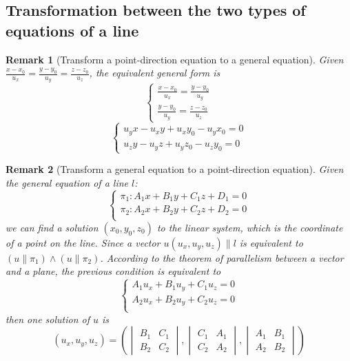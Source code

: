 \documentclass[onecolumn]{ctexart}
\newtheorem{remark}{Remark}
\begin{document}
\subsection{Transformation between the two types of equations of a line}

\begin{remark}[Transform a point-direction equation to a general equation]
  Given $\frac{x - x_0}{u_x} = \frac{y - y_0}{u_y} = \frac{z - z_0}{u_z}$, 
  the equivalent general form is
  \[
  \begin{cases}
    \frac{x - x_0}{u_x} = \frac{y - y_0}{u_y} \\
    \frac{y - y_0}{u_y} = \frac{z - z_0}{u_z}
  \end{cases}
  \]
  \begin{equation}
    \begin{cases}
      u_y x - u_x y + u_x y_0 - u_y x_0 = 0 \\
      u_z y - u_y z + u_y z_0 - u_z y_0 = 0
    \end{cases} 
  \end{equation}
\end{remark}

\begin{remark}[Transform a general equation to a point-direction equation]
  Given the general equation of a line $l$: 
  \[
  \begin{cases}
    \pi_1: A_1 x + B_1 y + C_1 z + D_1 = 0 \\
    \pi_2: A_2 x + B_2 y + C_2 z + D_2 = 0 \\
  \end{cases}
  \]
  we can find a solution $(x_0, y_0, z_0)$ to the linear system, which is the 
  coordinate of a point on the line. Since a vector $u(u_x, u_y, u_z) \parallel l$ 
  is equivalent to $(u \parallel \pi_1) \wedge (u \parallel \pi_2)$. According to 
  the theorem of parallelism between a vector and a plane, the previous condition 
  is equivalent to 
  \[
  \begin{cases}
    A_1 u_x + B_1 u_y + C_1 u_z = 0 \\
    A_2 u_x + B_2 u_y + C_2 u_z = 0 \\
  \end{cases}
  \]
  then one solution of $u$ is
  \[
  (u_x, u_y, u_z) = 
  \left(
  \begin{vmatrix}
    B_1 & C_1 \\
    B_2 & C_2
  \end{vmatrix},
  \begin{vmatrix}
    C_1 & A_1 \\
    C_2 & A_2
  \end{vmatrix},
  \begin{vmatrix}
    A_1 & B_1 \\
    A_2 & B_2
  \end{vmatrix}
  \right)
  \]
\end{remark}
\end{document}
